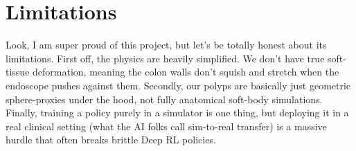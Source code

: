\section{Limitations}

Look, I am super proud of this project, but let's be totally honest about its limitations. First off, the physics are heavily simplified. We don't have true soft-tissue deformation, meaning the colon walls don't squish and stretch when the endoscope pushes against them. Secondly, our polyps are basically just geometric sphere-proxies under the hood, not fully anatomical soft-body simulations. Finally, training a policy purely in a simulator is one thing, but deploying it in a real clinical setting (what the AI folks call sim-to-real transfer) is a massive hurdle that often breaks brittle Deep RL policies.
